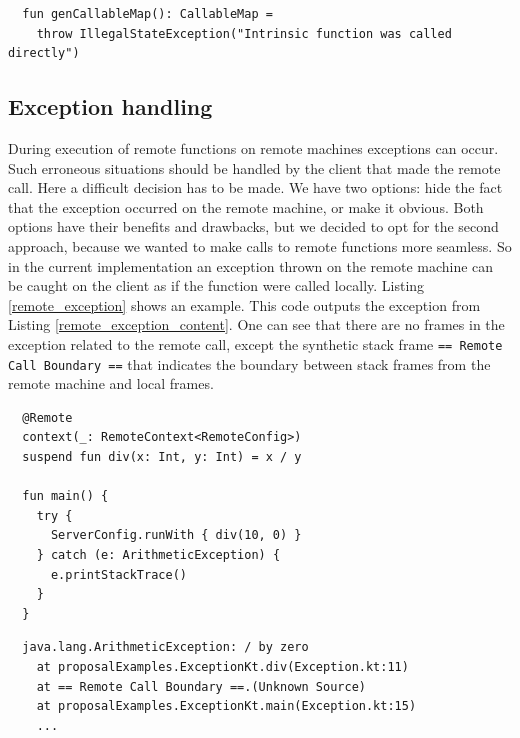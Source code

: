 \documentclass[a4paper,11pt,oneside]{article}
\begin{document}
\begin{listing}[!h]
  \begin{verbatim}
  fun genCallableMap(): CallableMap = 
    throw IllegalStateException("Intrinsic function was called directly")
  \end{verbatim}
  \caption{genCallableMap function}\label{gen_callable_map}
\end{listing}

\subsection{Exception handling}\label{exception_handling_section}

During execution of remote functions on remote machines exceptions can occur. Such erroneous situations
should be handled by the client that made the remote call. Here a difficult decision has to be made. We
have two options: hide the fact that the exception occurred on the remote machine, or make it obvious. Both options
have their benefits and drawbacks, but we decided to opt for the second approach, because we wanted
to make calls to remote functions more seamless. So
in the current implementation an exception thrown on the remote machine can be caught on the client as if the
function were called locally. Listing \ref{remote_exception} shows an example. This code outputs the
exception from Listing \ref{remote_exception_content}. One can see that there are no frames in the exception
related to the remote call, except the synthetic stack frame \texttt{== Remote Call Boundary ==} that indicates
the boundary between stack frames from the remote machine and local frames. 

\begin{listing}[!h]
  \begin{verbatim}
  @Remote
  context(_: RemoteContext<RemoteConfig>)
  suspend fun div(x: Int, y: Int) = x / y

  fun main() {
    try {
      ServerConfig.runWith { div(10, 0) }
    } catch (e: ArithmeticException) {
      e.printStackTrace()
    }
  }
  \end{verbatim}
  \caption{Remote exception handling}\label{remote_exception}
\end{listing}

\begin{listing}[!h]
  \begin{verbatim}
  java.lang.ArithmeticException: / by zero
    at proposalExamples.ExceptionKt.div(Exception.kt:11)
    at == Remote Call Boundary ==.(Unknown Source)
    at proposalExamples.ExceptionKt.main(Exception.kt:15)
    ...
  \end{verbatim}
  \caption{Remote exception content}\label{remote_exception_content}
\end{listing}
\end{document}
